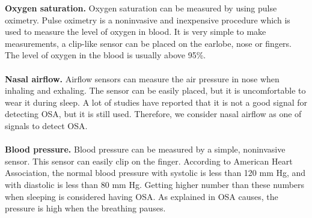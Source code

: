     \textbf{Oxygen saturation. } Oxygen saturation can be measured by using pulse oximetry. Pulse oximetry is a noninvasive and inexpensive procedure which is used to measure the level of oxygen in blood. It is very simple to make measurements, a clip-like sensor can be placed on the earlobe, nose or fingers\citep{WIKIHOW}. The level of oxygen in the blood is usually above 95\%.\\\\
    \textbf{Nasal airflow. } Airflow sensors can measure the air pressure in nose when inhaling and exhaling. The sensor can be easily placed, but it is uncomfortable to wear it during sleep. A lot of studies have reported that it is not a good signal for detecting OSA, but it is still used\citep{HINDIWAAIRFLOW}. Therefore, we consider nasal airflow as one of signals to detect OSA.\\\\
    \textbf{Blood pressure. } Blood pressure can be measured by a simple, noninvasive sensor. This sensor can easily clip on the finger. According to American Heart Association\citep{HEARTORG}, the normal blood pressure with systolic is less than 120 mm Hg, and with diastolic is less than 80 mm Hg. Getting higher number than these numbers when sleeping is considered having OSA. As explained in OSA causes, the pressure is high when the breathing pauses.\\
